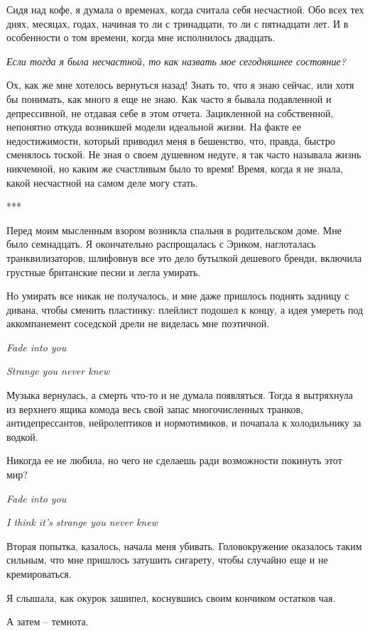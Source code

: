 \documentclass[
]{book}
\begin{document}
Сидя над кофе, я думала о временах, когда считала себя несчастной. Обо всех тех днях, месяцах, годах, начиная то ли с тринадцати, то ли с пятнадцати лет. И в особенности о том времени, когда мне исполнилось двадцать.

\emph{Если тогда я была несчастной, то как назвать мое сегодняшнее состояние?}

Ох, как же мне хотелось вернуться назад! Знать то, что я знаю сейчас, или хотя бы понимать, как много я еще не знаю. Как часто я бывала подавленной и депрессивной, не отдавая себе в этом отчета. Зацикленной на собственной, непонятно откуда возникшей модели идеальной жизни. На факте ее недостижимости, который приводил меня в бешенство, что, правда, быстро сменялось тоской. Не зная о своем душевном недуге, я так часто называла жизнь никчемной, но каким же счастливым было то время! Время, когда я не знала, какой несчастной на самом деле могу стать.

***

Перед моим мысленным взором возникла спальня в родительском доме. Мне было семнадцать. Я окончательно распрощалась с Эриком, наглоталась транквилизаторов, шлифовнув все это дело бутылкой дешевого бренди, включила грустные британские песни и легла умирать.

Но умирать все никак не получалось, и мне даже пришлось поднять задницу с дивана, чтобы сменить пластинку: плейлист подошел к концу, а идея умереть под аккомпанемент соседской дрели не виделась мне поэтичной.

\emph{Fade into you}

\emph{Strange you never knew}

Музыка вернулась, а смерть что-то и не думала появляться. Тогда я вытряхнула из верхнего ящика комода весь свой запас многочисленных транков, антидепрессантов, нейролептиков и нормотимиков, и почапала к холодильнику за водкой.

Никогда ее не любила, но чего не сделаешь ради возможности покинуть этот мир?

\emph{Fade into you}

\emph{I think it's strange you never knew}

Вторая попытка, казалось, начала меня убивать. Головокружение оказалось таким сильным, что мне пришлось затушить сигарету, чтобы случайно еще и не кремироваться.

Я слышала, как окурок зашипел, коснувшись своим кончиком остатков чая.

А затем -- темнота.
\end{document}
